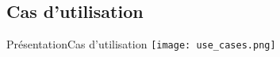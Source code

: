 \subsection{Cas d'utilisation}%

\begin{frame}{Présentation}{Cas d'utilisation}
    \texttt{[image: use\_cases.png]}
\end{frame}